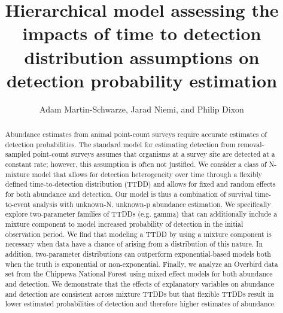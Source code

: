 \documentclass[useAMS,usenatbib,referee,12pt]{article}
\title{Hierarchical model assessing the impacts of time to detection distribution assumptions on detection probability estimation}
\author{Adam Martin-Schwarze, Jarad Niemi, and Philip Dixon}
\begin{document}
\maketitle
\newpage


\begin{abstract}

Abundance estimates from animal point-count surveys require accurate estimates of detection probabilities.  
The standard model for estimating detection from removal-sampled point-count surveys assumes that organisms at a survey site are detected at a constant rate; however, this assumption is often not justified.  
We consider a class of N-mixture model that allows for detection heterogeneity over time through a flexibly defined time-to-detection distribution (TTDD) and allows for fixed and random effects for both abundance and detection.
Our model is thus a combination of survival time-to-event analysis with unknown-N, unknown-p abundance estimation.  
We specifically explore two-parameter families of TTDDs (e.g. gamma) that can additionally include a mixture component to model increased probability of detection in the initial observation period.
We find that modeling a TTDD by using a mixture component is necessary when data have a chance of arising from a distribution of this nature.
In addition, two-parameter distributions can outperform exponential-based models both when the truth is exponential or non-exponential.
Finally, we analyze an Overbird data set from the Chippewa National Forest using mixed effect models for both abundance and detection.
We demonstrate that the effects of explanatory variables on abundance and detection are consistent across mixture TTDDs but that flexible TTDDs result in lower estimated probabilities of detection and therefore higher estimates of abundance. 

\end{abstract}
\end{document}
